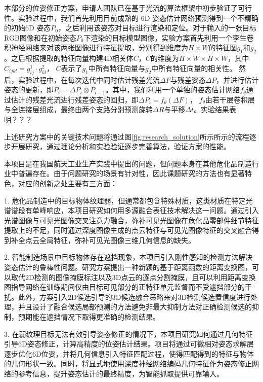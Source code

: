 \documentclass[12pt]{article}
\begin{document}
本部分的位姿修正方案，申请人团队已在基于光流的算法框架中初步验证了可行性。实验过程中，我们首先利用目前成熟的 6D 姿态估计网络预测得到一个不精确的初始6D 姿态$P_0$，之后利用该姿态对目标进行渲染和定位。对于输入的一张目标RGB图像和在初始姿态$P_0$下渲染的目标模型图像，实验方案首先利用一个孪生卷积神经网络来对该两张图像进行特征提取，分别得到维度为$H\times W$的特征图$g_1$和$g_2$。之后根据提取的特征向量构建4D相关体$C$，$C$的维度为$H\times W \times H \times W$，其中    $C_{ijkl} = g^1_{ij} \cdot g^2_{kl}$，
$C$表示了$g_1$中所有特征向量与$g_2$中所有特征向量的相关性。
然后，实验过程中，在每次迭代中同时估计残差光流$\Delta F$与残差姿态$\Delta P$，并进行估计姿态的更新，即$P_i = \Delta P_i \otimes P_{i-1}$。其中，我们利用一个单独的姿态估计网络$f_{\theta}$通过估计的残差光流进行残差姿态的回归，即$\Delta P_i = f_{\theta}(\Delta F)$，
$f_\theta$由若干层卷积层与全连接层组成，最终由两个支路分别预测旋转$\Delta R$与平移$\Delta t$。实验结果表明？？？

上述研究方案中的关键技术问题将通过图\ref{fig:research_solution}所示所示的流程逐步开展研究，通过理论分析和实验验证逐步完善算法，验证方案的性能。



本项目是在我国航天工业生产实践中提出的问题，但问题本身在其他危化品制造行业中普遍存在。由于问题研究的场景有针对性，因此课题研究的方法也有显著特色，对应的创新之处主要有三方面：

1. 危化品制造中的目标物体纹理弱，但通常都包含特殊材质，这类材质在特定光谱谱段有单峰响应，本项目研究如何用多源融合表征技术解决这一问题。通过引入光谱图像与可见光图像交叉注意力融合，弥补可见光图像在危化品零部件细节特征提取上的不足，同时通过深度图像生成的点云特征与可见光图像特征的交叉融合得到补全点云全局特征，弥补可见光图像三维几何信息的缺失。

2. 智能制造场景中目标物体存在遮挡现象，本项目引入刚性感知的检测方法解决姿态估计的鲁棒性问题。研究方案提出一种新颖的基于距离函数的距离变换图，可以取代2D检测的图像掩膜标注以及3D点云的逐点分割掩膜，且可以利用距离变换图指导网络在训练期间仅由目标可见部分的正特征单元监督而不受遮挡部分的干扰。此外，方案引入2D候选引导的3D候选融合策略来对3D检测候选置信度进行处理，并且设计了融合候选局部预测的方法避免非最大抑制方法对正确检测候选的抑制，预期能在遮挡情况下取得更准确的检测结果。

3. 在弱纹理目标无法有效引导姿态修正的情况下，本项目研究如何通过几何特征引导6D姿态修正，计算高精度的位姿估计结果。项目将通过可微相对姿态求解层逐步优化6D位姿，并将几何信息引入特征匹配过程，使得匹配得到的特征与物体的几何形状一致。同时，将显式地使用深度神经网络编码几何特征作为姿态修正网络的参考信息，提升姿态估计的最终精度，为智能抓取提供可靠输入。
\end{document}
